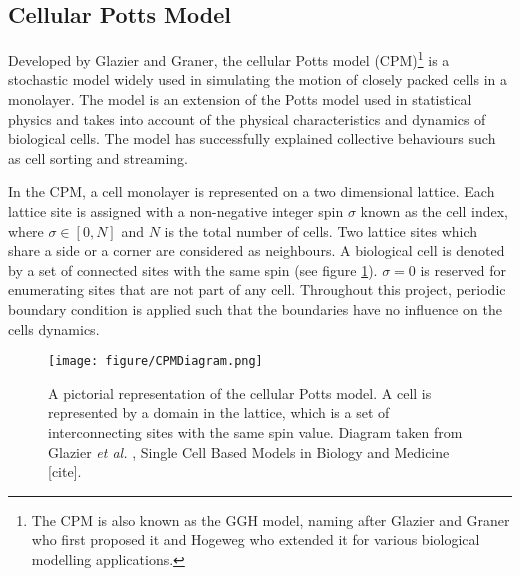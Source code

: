 \documentclass[a4paper,12pt]{article}
\newcommand{\etal}{\emph{et al. }}
\begin{document}
\subsection{Cellular Potts Model}
Developed by Glazier and Graner\cite{graner1992}, the cellular Potts model (CPM)\footnote{The CPM is also known as the GGH model, naming after Glazier and Graner who first proposed it and Hogeweg who extended it for various biological modelling applications.} is a stochastic model widely used in simulating the motion of closely packed cells in a monolayer. The model is an extension of the Potts model used in statistical physics and takes into account of the physical characteristics and dynamics of biological cells. The model has successfully explained collective behaviours such as cell sorting \cite{graner1992} and streaming\cite{szabo2010}.

In the CPM, a cell monolayer is represented on a two dimensional lattice. Each lattice site is assigned with a non-negative integer spin $\sigma$ known as the cell index, where $\sigma \in [0,N]$ and $N$ is the total number of cells. Two lattice sites which share a side or a corner are considered as neighbours. A biological cell is denoted by a set of connected sites with the same spin (see figure \ref{fig:CPM}). $\sigma = 0$ is reserved for enumerating sites that are not part of any cell. Throughout this project, periodic boundary condition is applied such that the boundaries have no influence on the cells dynamics.

\begin{figure}[h]
\centering
\texttt{[image: figure/CPMDiagram.png]}
\caption{A pictorial representation of the cellular Potts model. A cell is represented by a domain in the lattice, which is a set of interconnecting sites with the same spin value. Diagram taken from Glazier \etal, Single Cell Based Models in Biology and Medicine [cite].}
\label{fig:CPM}
\end{figure}
\end{document}
